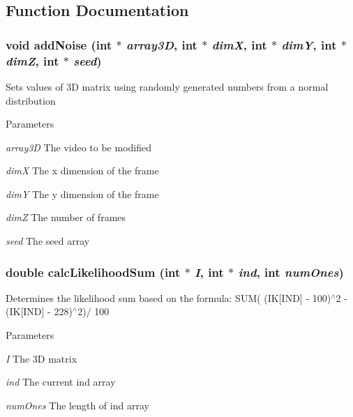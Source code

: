 \subsection{Function Documentation}
\hypertarget{ex__particle__CUDA__naive__full_8cu_ac771bf31b048f6a46077a3da36068a02}{
\subsubsection[{addNoise}]{\setlength{\rightskip}{0pt plus 5cm}void addNoise (int $\ast$ {\em array3D}, \/  int $\ast$ {\em dimX}, \/  int $\ast$ {\em dimY}, \/  int $\ast$ {\em dimZ}, \/  int $\ast$ {\em seed})}}
\label{ex__particle__CUDA__naive__full_8cu_ac771bf31b048f6a46077a3da36068a02}
Sets values of 3D matrix using randomly generated numbers from a normal distribution 
\begin{DoxyParams}{Parameters}
\item[{\em array3D}]The video to be modified \item[{\em dimX}]The x dimension of the frame \item[{\em dimY}]The y dimension of the frame \item[{\em dimZ}]The number of frames \item[{\em seed}]The seed array \end{DoxyParams}
\hypertarget{ex__particle__CUDA__naive__full_8cu_a875b89dec232da58dee8863b7d673808}{
\subsubsection[{calcLikelihoodSum}]{\setlength{\rightskip}{0pt plus 5cm}double calcLikelihoodSum (int $\ast$ {\em I}, \/  int $\ast$ {\em ind}, \/  int {\em numOnes})}}
\label{ex__particle__CUDA__naive__full_8cu_a875b89dec232da58dee8863b7d673808}
Determines the likelihood sum based on the formula: SUM( (IK\mbox{[}IND\mbox{]} -\/ 100)$^\wedge$2 -\/ (IK\mbox{[}IND\mbox{]} -\/ 228)$^\wedge$2)/ 100 
\begin{DoxyParams}{Parameters}
\item[{\em I}]The 3D matrix \item[{\em ind}]The current ind array \item[{\em numOnes}]The length of ind array \end{DoxyParams}
